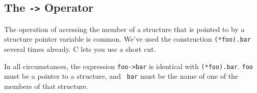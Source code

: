 \subsection{The {\tt ->} Operator}

The operation of accessing the member of a structure that is pointed to
by a structure pointer variable is common.  We've used the construction
{\tt (*foo).bar} several times already.  C lets you use a short cut.

In all circumstances, the expression {\tt foo->bar} is identical with
{\tt (*foo).bar}.  {\tt foo} must be a pointer to a structure, and {\tt
bar} must be the name of one of the members of that structure.  




